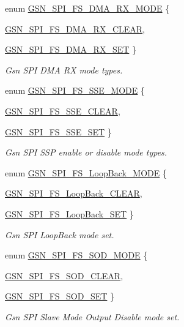 \begin{DoxyCompactItemize}
enum \hyperlink{a00655_ga82f3e42cd7181328045726b29cf916c6}{GSN\_\-SPI\_\-FS\_\-DMA\_\-RX\_\-MODE} \{ \par
\hyperlink{a00655_gga82f3e42cd7181328045726b29cf916c6ab399a79e14f5345e99aa6f4e5f7b2f45}{GSN\_\-SPI\_\-FS\_\-DMA\_\-RX\_\-CLEAR}, 
\par
\hyperlink{a00655_gga82f3e42cd7181328045726b29cf916c6acd22f6b1874ec9399c493ca0c281c534}{GSN\_\-SPI\_\-FS\_\-DMA\_\-RX\_\-SET}
 \}
\begin{DoxyCompactList}\small\item\em Gsn SPI DMA RX mode types. \end{DoxyCompactList}\item 
enum \hyperlink{a00655_ga9d787cd2d26e81bd00ce1a1392958e27}{GSN\_\-SPI\_\-FS\_\-SSE\_\-MODE} \{ \par
\hyperlink{a00655_gga9d787cd2d26e81bd00ce1a1392958e27abfb75ca8d636e5bfd3cd1d54918804b2}{GSN\_\-SPI\_\-FS\_\-SSE\_\-CLEAR}, 
\par
\hyperlink{a00655_gga9d787cd2d26e81bd00ce1a1392958e27a53bc3a08b866507b2d1fb02ea7018f01}{GSN\_\-SPI\_\-FS\_\-SSE\_\-SET}
 \}
\begin{DoxyCompactList}\small\item\em Gsn SPI SSP enable or disable mode types. \end{DoxyCompactList}\item 
enum \hyperlink{a00655_ga082cec3b28f66e93faf6463fa1b76413}{GSN\_\-SPI\_\-FS\_\-LoopBack\_\-MODE} \{ \par
\hyperlink{a00655_gga082cec3b28f66e93faf6463fa1b76413a05a16837b5f54c934ddf4eaee2caeaac}{GSN\_\-SPI\_\-FS\_\-LoopBack\_\-CLEAR}, 
\par
\hyperlink{a00655_gga082cec3b28f66e93faf6463fa1b76413a438b96d1fb5d5036988600678c8ba207}{GSN\_\-SPI\_\-FS\_\-LoopBack\_\-SET}
 \}
\begin{DoxyCompactList}\small\item\em Gsn SPI LoopBack mode set. \end{DoxyCompactList}\item 
enum \hyperlink{a00655_ga7fdf2844c62b8075aa8d730cc4e17134}{GSN\_\-SPI\_\-FS\_\-SOD\_\-MODE} \{ \par
\hyperlink{a00655_gga7fdf2844c62b8075aa8d730cc4e17134ae2acc61c8aef0461e99c6009f50350b9}{GSN\_\-SPI\_\-FS\_\-SOD\_\-CLEAR}, 
\par
\hyperlink{a00655_gga7fdf2844c62b8075aa8d730cc4e17134aa50aaafe62fb864c5f2591a5401d3dfe}{GSN\_\-SPI\_\-FS\_\-SOD\_\-SET}
 \}
\begin{DoxyCompactList}\small\item\em Gsn SPI Slave Mode Output Disable mode set. \end{DoxyCompactList}\item 

\end{DoxyCompactItemize}
